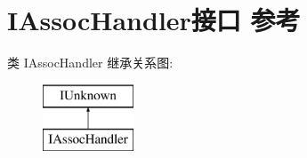 \hypertarget{interface_i_assoc_handler}{}\section{I\+Assoc\+Handler接口 参考}
\label{interface_i_assoc_handler}
类 I\+Assoc\+Handler 继承关系图\+:\begin{figure}[H]
\begin{center}
\leavevmode
\includegraphics[height=2.000000cm]{interface_i_assoc_handler}
\end{center}
\end{figure}
